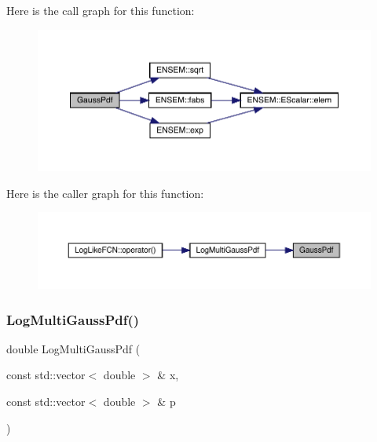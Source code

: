 Here is the call graph for this function\+:
\nopagebreak
\begin{figure}[H]
\begin{center}
\leavevmode
\includegraphics[width=350pt]{d7/df1/adat-devel_2other__libs_2minuit_2test_2MnSim_2ParallelTest_8cxx_a8d06db116c17441efc94ec186e960754_cgraph}
\end{center}
\end{figure}
Here is the caller graph for this function\+:
\nopagebreak
\begin{figure}[H]
\begin{center}
\leavevmode
\includegraphics[width=350pt]{d7/df1/adat-devel_2other__libs_2minuit_2test_2MnSim_2ParallelTest_8cxx_a8d06db116c17441efc94ec186e960754_icgraph}
\end{center}
\end{figure}
\mbox{\label{adat-devel_2other__libs_2minuit_2test_2MnSim_2ParallelTest_8cxx_a3dbc0f5a3a5823d5a68abacc83894768}} 
\subsubsection{\texorpdfstring{LogMultiGaussPdf()}{LogMultiGaussPdf()}}
{\footnotesize\ttfamily double Log\+Multi\+Gauss\+Pdf (\begin{DoxyParamCaption}\item[{const std\+::vector$<$ double $>$ \&}]{x,  }\item[{const std\+::vector$<$ double $>$ \&}]{p }\end{DoxyParamCaption})}

